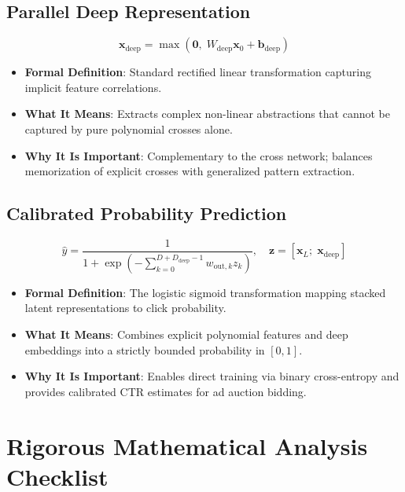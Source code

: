 \documentclass[11pt,a4paper]{article}
\theoremstyle{definition}
\begin{document}
\subsection{Parallel Deep Representation}
{\boldmath
\begin{equation}
\mathbf{x}_{\text{deep}} = \max\left( \mathbf{0}, \; W_{\text{deep}} \mathbf{x}_0 + \mathbf{b}_{\text{deep}} \right)
\end{equation}
}
\begin{itemize}
    \item \textbf{Formal Definition}: Standard rectified linear transformation capturing implicit feature correlations.
    \item \textbf{What It Means}: Extracts complex non-linear abstractions that cannot be captured by pure polynomial crosses alone.
    \item \textbf{Why It Is Important}: Complementary to the cross network; balances memorization of explicit crosses with generalized pattern extraction.
\end{itemize}

\subsection{Calibrated Probability Prediction}
{\boldmath
\begin{equation}
\widehat{y} = \frac{1}{1 + \exp\left( - \sum_{k=0}^{D + D_{\text{deep}}-1} w_{\text{out}, k} z_k \right)}, \quad \mathbf{z} = [\mathbf{x}_L; \; \mathbf{x}_{\text{deep}}]
\end{equation}
}
\begin{itemize}
    \item \textbf{Formal Definition}: The logistic sigmoid transformation mapping stacked latent representations to click probability.
    \item \textbf{What It Means}: Combines explicit polynomial features and deep embeddings into a strictly bounded probability in $[0, 1]$.
    \item \textbf{Why It Is Important}: Enables direct training via binary cross-entropy and provides calibrated CTR estimates for ad auction bidding.
\end{itemize}

\section{Rigorous Mathematical Analysis Checklist}
\end{document}
